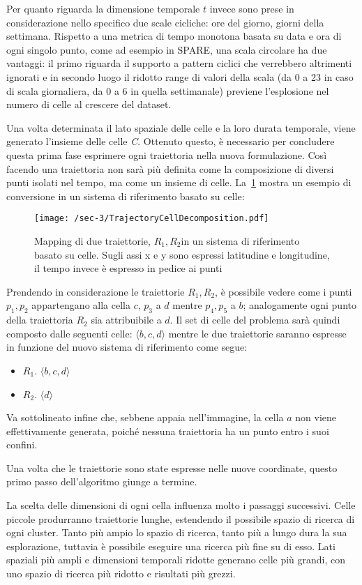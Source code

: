 Per quanto riguarda la dimensione temporale \(t\) invece sono prese in considerazione nello specifico due scale cicliche: ore del giorno, giorni della settimana.
Rispetto a una metrica di tempo monotona basata su data e ora di ogni singolo punto, come ad esempio in SPARE, una scala circolare ha due vantaggi: il primo riguarda
il supporto a pattern ciclici che verrebbero altrimenti ignorati e in secondo luogo il ridotto range di valori della scala (da 0 a 23 in caso di scala giornaliera, da 0 a 6 in quella settimanale) previene l'esplosione nel numero di celle al crescere del dataset.

Una volta determinata il lato spaziale delle celle e la loro durata temporale, viene generato l'insieme delle celle \textit{C}. 
Ottenuto questo, è necessario per concludere questa prima fase esprimere ogni traiettoria nella nuova formulazione.
Così facendo una traiettoria non sarà più definita come la composizione di diversi punti isolati nel tempo, ma come un insieme di celle. 
La~\cref{fig:chap-3:trajectory-cell-division} mostra un esempio di conversione in un sistema di riferimento basato su celle:

\begin{figure}
  \centering
  \texttt{[image: /sec-3/TrajectoryCellDecomposition.pdf]}
  \caption{Mapping di due traiettorie, \(R_1, R_2\)in un sistema di riferimento basato su celle. Sugli assi x e y sono espressi latitudine e longitudine, il tempo invece è espresso in pedice ai punti}%
  \label{fig:chap-3:trajectory-cell-division}
\end{figure}

Prendendo in considerazione le traiettorie \(R_1, R_2\), è possibile vedere come i punti \(p_1,p_2\) appartengano alla cella \(c\),
\(p_3\) a \(d\) mentre \(p_4,p_5\) a \(b\); analogamente ogni punto della traiettoria \(R_2\) sia attribuibile a \(d\).
Il set di celle del problema sarà quindi composto dalle seguenti celle: \(\langle b,c,d \rangle\) mentre le due traiettorie saranno espresse in funzione del nuovo sistema di riferimento come segue:

\begin{itemize}

  \item \(R_1\). \(\langle b,c,d \rangle\)
  \item \(R_2\). \(\langle d \rangle\)

\end{itemize}

Va sottolineato infine che, sebbene appaia nell'immagine, la cella \(a\) non viene effettivamente generata, poiché nessuna traiettoria ha un punto entro i suoi confini.

Una volta che le traiettorie sono state espresse nelle nuove coordinate, questo primo passo dell'algoritmo giunge a termine.

La scelta delle dimensioni di ogni cella influenza molto i passaggi successivi. 
Celle piccole produrranno traiettorie lunghe, estendendo il possibile spazio di ricerca di ogni cluster.
Tanto più ampio lo spazio di ricerca, tanto più a lungo dura la sua esplorazione, tuttavia è possibile eseguire una ricerca più fine su di esso.
Lati spaziali più ampli e dimensioni temporali ridotte generano celle più grandi, con uno spazio di ricerca più ridotto e risultati più grezzi.